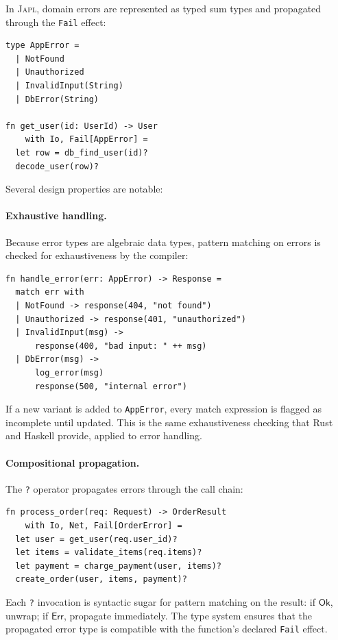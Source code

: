 \documentclass[11pt,twocolumn]{article}
\newcommand{\japl}{\textsc{Japl}}
\newcommand{\Fail}{\texttt{Fail}}
\newcommand{\OK}{\ensuremath{\mathsf{Ok}}}
\newcommand{\Err}{\ensuremath{\mathsf{Err}}}
\begin{document}
In \japl{}, domain errors are represented as typed sum types and propagated through the \Fail{} effect:

\begin{lstlisting}
type AppError =
  | NotFound
  | Unauthorized
  | InvalidInput(String)
  | DbError(String)

fn get_user(id: UserId) -> User
    with Io, Fail[AppError] =
  let row = db_find_user(id)?
  decode_user(row)?
\end{lstlisting}

Several design properties are notable:

\paragraph{Exhaustive handling.} Because error types are algebraic data types, pattern matching on errors is checked for exhaustiveness by the compiler:

\begin{lstlisting}
fn handle_error(err: AppError) -> Response =
  match err with
  | NotFound -> response(404, "not found")
  | Unauthorized -> response(401, "unauthorized")
  | InvalidInput(msg) ->
      response(400, "bad input: " ++ msg)
  | DbError(msg) ->
      log_error(msg)
      response(500, "internal error")
\end{lstlisting}

If a new variant is added to \texttt{AppError}, every match expression is flagged as incomplete until updated. This is the same exhaustiveness checking that Rust and Haskell provide, applied to error handling.

\paragraph{Compositional propagation.} The \texttt{?} operator propagates errors through the call chain:

\begin{lstlisting}
fn process_order(req: Request) -> OrderResult
    with Io, Net, Fail[OrderError] =
  let user = get_user(req.user_id)?
  let items = validate_items(req.items)?
  let payment = charge_payment(user, items)?
  create_order(user, items, payment)?
\end{lstlisting}

Each \texttt{?} invocation is syntactic sugar for pattern matching on the result: if \OK{}, unwrap; if \Err{}, propagate immediately. The type system ensures that the propagated error type is compatible with the function's declared \Fail{} effect.
\end{document}
